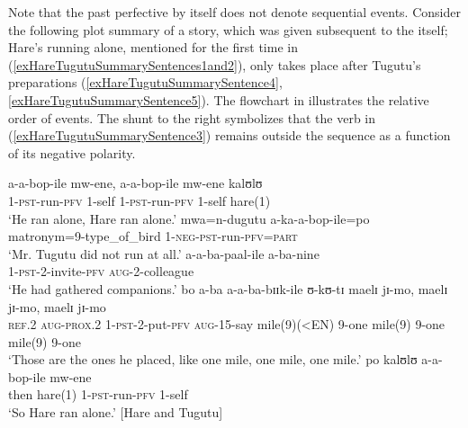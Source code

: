 Note that the past perfective by itself does not denote sequential events. Consider the following plot summary of a story, which was given subsequent to the  itself; Hare's running alone, mentioned for the first time in (\ref{exHareTugutuSummarySentences1and2}), only takes place after Tugutu's preparations (\ref{exHareTugutuSummarySentence4}, \ref{exHareTugutuSummarySentence5}). The flowchart in  illustrates the relative order of events. The shunt to the right symbolizes that the  verb in (\ref{exHareTugutuSummarySentence3})  remains outside the sequence as a function of its negative polarity.

\begin{exe}
\ex \label{exHareTugutuSummary} \begin{xlist}
\ex\label{exHareTugutuSummarySentences1and2}\gll a-a-bop-ile mw-ene, a-a-bop-ile mw-ene kalʊlʊ\\
1-\textsc{pst}-run-\textsc{pfv} 1-self 1-\textsc{pst}-run-\textsc{pfv} 1-self hare(1)\\
\glt `He ran alone, Hare ran alone.'
\ex\label{exHareTugutuSummarySentence3}\gll mwa=n-dugutu a-ka-a-bop-ile=po\\
matronym=9-type\_of\_bird 1-\textsc{neg}-\textsc{pst}-run-\textsc{pfv}=\textsc{part}\\
\glt `Mr. Tugutu did not run at all.'
\ex\label{exHareTugutuSummarySentence4}\gll a-a-ba-paal-ile a-ba-nine\\
1-\textsc{pst}-2-invite-\textsc{pfv} \textsc{aug}-2-colleague\\
\glt \lq He had gathered companions.'
\ex\label{exHareTugutuSummarySentence5}\gll bo a-ba a-a-ba-bɪɪk-ile ʊ-kʊ-tɪ maelɪ jɪ-mo, maelɪ jɪ-mo, maelɪ jɪ-mo\\
\textsc{ref.2} \textsc{aug}-\textsc{prox.2} 1-\textsc{pst}-2-put-\textsc{pfv} \textsc{aug}-15-say mile(9)(<EN) 9-one mile(9) 9-one mile(9) 9-one\\
\glt \lq Those are the ones he placed, like one mile, one mile, one mile.'%
\ex\label{exHareTugutuSummarySentence6}\gll po kalʊlʊ a-a-bop-ile mw-ene\\
then hare(1) 1-\textsc{pst}-run-\textsc{pfv} 1-self\\
\glt \lq So Hare ran alone.' [Hare and Tugutu]
\end{xlist}
\end{exe}

